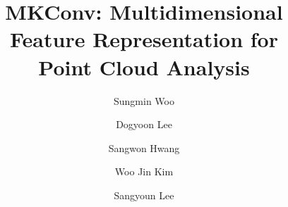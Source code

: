 \documentclass[preprint,12pt]{elsarticle}
\begin{document}
\begin{frontmatter}

\title{MKConv: Multidimensional Feature Representation for \\ Point Cloud Analysis}

\author{Sungmin Woo}
\author{Dogyoon Lee}
\author{Sangwon Hwang}
\author{Woo Jin Kim}
\author{Sangyoun Lee}


\address{School of Electrical and Electronic Engineering, Yonsei University, \\ Seoul 03722, South Korea}
\begin{comment}
\begin{abstract}
Despite the remarkable success of deep learning, optimal convolution operation on point cloud remains indefinite due to its irregular data structure. Continuous convolution on points needs a large number of parameters or hand-crafted function to construct continuous kernels and discrete convolution requires points to be voxelized, suffering from information loss. To address the issues, we present multidimensional kernel Convolution (MKConv) that exploits both continuous and discrete convolutions. Our continuous convolution uniquely employs a 3D cubic form of kernel weight representation that splits feature into voxels in embedding space. By consecutively applying discrete 3D convolutions on the multidimensional features in a spatial manner, preceding continuous convolution is forced to learn spatial feature mapping, i.e., feature voxelization. In this way, continuous and our discrete convolutions on these fixed structured data do not suffer from discretization artifacts thanks to voxelization in embedding space. Also, geometric information can be detailed by encoding with subdivided features. Furthermore, we propose a spatial attention module,  (MLA), to provide comprehensive structure awareness within the local point set and hence produce representative features. By learning feature voxelization with MLA, MKConv can extract enriched features for effective point cloud analysis. We show that MKConv has great applicability to point cloud processing tasks including object classification, object part segmentation, and scene semantic segmentation with state-of-the-art results.
\end{abstract}
\end{comment}


\end{frontmatter}
\end{document}
